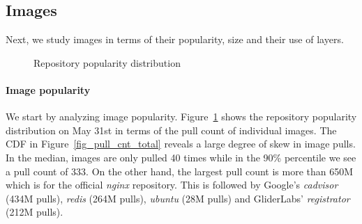 \subsection{Images}
\label{sec:images}

Next, we study images in terms of their popularity, size and their use of layers.

\begin{figure}[!t]
	\centering
	\caption{Repository popularity distribution}
	\label{fig-pop}
\end{figure}

\paragraph{Image popularity}
%
We start by analyzing image popularity.
Figure~\ref{fig-pop} shows the repository popularity distribution on May 31st in
terms of the pull count of individual images.
The CDF in Figure~\ref{fig_pull_cnt_total} reveals a large degree of skew in image
pulls. In the median, images are only pulled 40 times while in the 90\% percentile we
see a pull count of 333. On the other hand, the largest pull count is more than 650M 
which is for the official \textit{nginx} repository. This is followed by
Google's \textit{cadvisor} (434M pulls), \textit{redis} (264M pulls),
\textit{ubuntu} (28M pulls) and GliderLabs' \textit{registrator} (212M pulls).


